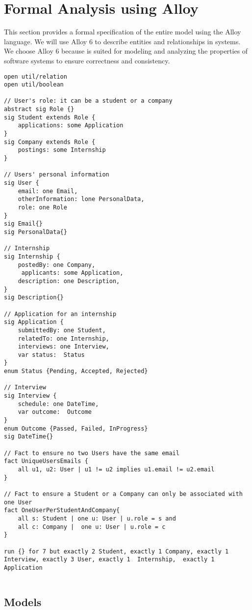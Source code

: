 \chapter{Formal Analysis using Alloy}
This section provides a formal specification of the entire model using the Alloy language. We will use Alloy 6 to describe entities and relationships in systems. We choose Alloy 6 because is suited for modeling and analyzing the properties of software systems to ensure correctness and consistency.




\begin{lstlisting}
open util/relation
open util/boolean

// User's role: it can be a student or a company
abstract sig Role {}
sig Student extends Role {
    applications: some Application
}
sig Company extends Role {
    postings: some Internship
}

// Users' personal information
sig User {
    email: one Email,
    otherInformation: lone PersonalData,
    role: one Role
}
sig Email{}
sig PersonalData{}

// Internship
sig Internship {
    postedBy: one Company,
     applicants: some Application,
    description: one Description,
}
sig Description{}

// Application for an internship
sig Application {
    submittedBy: one Student,
    relatedTo: one Internship,
    interviews: one Interview,
    var status:  Status
}
enum Status {Pending, Accepted, Rejected}

// Interview
sig Interview {
    schedule: one DateTime,
    var outcome:  Outcome
}
enum Outcome {Passed, Failed, InProgress}
sig DateTime{}

// Fact to ensure no two Users have the same email
fact UniqueUsersEmails {
    all u1, u2: User | u1 != u2 implies u1.email != u2.email
}

// Fact to ensure a Student or a Company can only be associated with one User
fact OneUserPerStudentAndCompany{
    all s: Student | one u: User | u.role = s and
    all c: Company |  one u: User | u.role = c
}

run {} for 7 but exactly 2 Student, exactly 1 Company, exactly 1 Interview, exactly 3 User, exactly 1  Internship,  exactly 1  Application


\end{lstlisting}


\section{ Models}